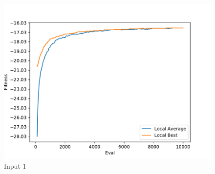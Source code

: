 \documentclass{standalone}
\begin{document}
\begin{figure}[!htb]
	\caption{Input 1}
	\label{fig:graph_1009}
	\includegraphics[width=\textwidth]{../graphs/graphs/1009.pdf}
\end{figure}
\end{document}
